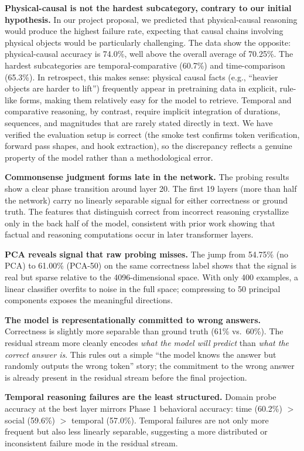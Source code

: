 \documentclass[11pt]{article}
\begin{document}
\textbf{Physical-causal is not the hardest subcategory, contrary to our initial hypothesis.} In our project proposal, we predicted that physical-causal reasoning would produce the highest failure rate, expecting that causal chains involving physical objects would be particularly challenging. The data show the opposite: physical-causal accuracy is 74.0\%, well above the overall average of 70.25\%. The hardest subcategories are temporal-comparative (60.7\%) and time-comparison (65.3\%). In retrospect, this makes sense: physical causal facts (e.g., ``heavier objects are harder to lift'') frequently appear in pretraining data in explicit, rule-like forms, making them relatively easy for the model to retrieve. Temporal and comparative reasoning, by contrast, require implicit integration of durations, sequences, and magnitudes that are rarely stated directly in text. We have verified the evaluation setup is correct (the smoke test confirms token verification, forward pass shapes, and hook extraction), so the discrepancy reflects a genuine property of the model rather than a methodological error.

\textbf{Commonsense judgment forms late in the network.} The probing results show a clear phase transition around layer 20. The first 19 layers (more than half the network) carry no linearly separable signal for either correctness or ground truth. The features that distinguish correct from incorrect reasoning crystallize only in the back half of the model, consistent with prior work showing that factual and reasoning computations occur in later transformer layers.

\textbf{PCA reveals signal that raw probing misses.} The jump from 54.75\% (no PCA) to 61.00\% (PCA-50) on the same correctness label shows that the signal is real but sparse relative to the 4096-dimensional space. With only 400 examples, a linear classifier overfits to noise in the full space; compressing to 50 principal components exposes the meaningful directions.

\textbf{The model is representationally committed to wrong answers.} Correctness is slightly more separable than ground truth (61\% vs.\ 60\%). The residual stream more cleanly encodes \textit{what the model will predict} than \textit{what the correct answer is}. This rules out a simple ``the model knows the answer but randomly outputs the wrong token'' story; the commitment to the wrong answer is already present in the residual stream before the final projection.

\textbf{Temporal reasoning failures are the least structured.} Domain probe accuracy at the best layer mirrors Phase 1 behavioral accuracy: time (60.2\%) $>$ social (59.6\%) $>$ temporal (57.0\%). Temporal failures are not only more frequent but also less linearly separable, suggesting a more distributed or inconsistent failure mode in the residual stream.
\end{document}
